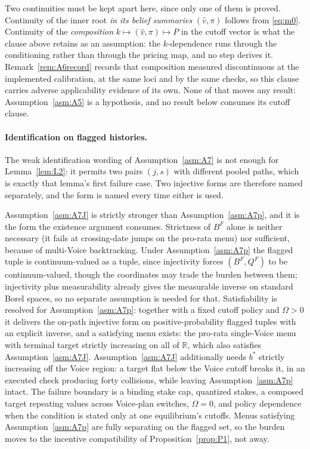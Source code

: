 \documentclass[11pt]{article}
\begin{document}
Two continuities must be kept apart here, since only one of them is proved. Continuity of the inner
root \emph{in its belief summaries} $(\hat v,\pi)$ follows from \eqref{eq:m0}. Continuity of the
\emph{composition} $k \mapsto (\hat v,\pi) \mapsto P$ in the cutoff vector is what the clause above
retains as an assumption: the $k$-dependence runs through the conditioning rather than through the
pricing map, and no step derives it. Remark~\ref{rem:A6record} records that composition measured
discontinuous at the implemented calibration, at the same loci and by the same checks, so this
clause carries adverse applicability evidence of its own. None of that moves any result:
Assumption~\ref{asm:A5} is a hypothesis, and no result below consumes its cutoff clause.

\paragraph{Identification on flagged histories.}
The weak identification wording of Assumption~\ref{asm:A7} is not enough for Lemma~\ref{lem:L2}: it permits two pairs $(j,s)$
with different pooled paths, which is exactly that lemma's first failure case. Two injective forms
are therefore named separately, and the form is named every time either is used.

Assumption~\ref{asm:A7J} is strictly stronger than Assumption~\ref{asm:A7p}, and it is the form the
existence argument consumes. Strictness of $B^F$ alone is neither necessary (it fails at
crossing-date jumps on the pro-rata menu) nor sufficient, because of multi-Voice backtracking.
Under Assumption~\ref{asm:A7p} the flagged tuple is continuum-valued as a tuple, since injectivity
forces $(B^F,Q^F)$ to be continuum-valued, though the coordinates may trade the burden between them;
injectivity plus measurability already gives the measurable inverse on standard Borel spaces, so no
separate assumption is needed for that. Satisfiability is resolved for Assumption~\ref{asm:A7p}:
together with a fixed cutoff policy and $\Omega > 0$ it delivers the on-path injective form on
positive-probability flagged tuples with an explicit inverse, and a satisfying menu exists: the
pro-rata single-Voice menu with terminal target strictly increasing on all of $\mathbb R$, which also
satisfies Assumption~\ref{asm:A7J}. Assumption~\ref{asm:A7J} additionally needs $b^*$ strictly
increasing off the Voice region: a target flat below the Voice cutoff breaks it, in an executed
check producing forty collisions, while leaving Assumption~\ref{asm:A7p} intact. The failure boundary
is a binding stake cap, quantized stakes, a composed target repeating values
across Voice-plan switches, $\Omega = 0$, and policy dependence when the condition is stated only at
one equilibrium's cutoffs. Menus satisfying Assumption~\ref{asm:A7p} are fully separating on the
flagged set, so the burden moves to the incentive compatibility of Proposition~\ref{prop:P1}, not
away.
\end{document}
